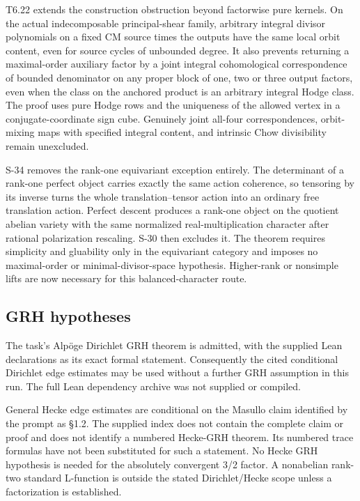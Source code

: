 \documentclass[11pt,a4paper]{article}
\theoremstyle{definition}
\begin{document}
T6.22 extends the construction obstruction beyond factorwise pure
kernels. On the actual indecomposable principal-shear family, arbitrary
integral divisor polynomials on a fixed CM source times the outputs have
the same local orbit content, even for source cycles of unbounded
degree. It also prevents returning a maximal-order auxiliary factor by a
joint integral cohomological correspondence of bounded denominator on
any proper block of one, two or three output factors, even when the
class on the anchored product is an arbitrary integral Hodge class. The
proof uses pure Hodge rows and the uniqueness of the allowed vertex in a
conjugate-coordinate sign cube. Genuinely joint all-four
correspondences, orbit-mixing maps with specified integral content, and
intrinsic Chow divisibility remain unexcluded.

S-34 removes the rank-one equivariant exception entirely. The
determinant of a rank-one perfect object carries exactly the same action
coherence, so tensoring by its inverse turns the whole
translation--tensor action into an ordinary free translation action.
Perfect descent produces a rank-one object on the quotient abelian
variety with the same normalized real-multiplication character after
rational polarization rescaling. S-30 then excludes it. The theorem
requires simplicity and gluability only in the equivariant category and
imposes no maximal-order or minimal-divisor-space hypothesis.
Higher-rank or nonsimple lifts are now necessary for this
balanced-character route.

\subsection{GRH hypotheses}\label{IMPLICATIONS-grh-hypotheses}

The task's Alpöge Dirichlet GRH theorem is admitted, with the supplied
Lean declarations as its exact formal statement. Consequently the cited
conditional Dirichlet edge estimates may be used without a further GRH
assumption in this run. The full Lean dependency archive was not
supplied or compiled.

General Hecke edge estimates are conditional on the Masullo claim
identified by the prompt as §1.2. The supplied index does not contain
the complete claim or proof and does not identify a numbered Hecke-GRH
theorem. Its numbered trace formulas have not been substituted for such
a statement. No Hecke GRH hypothesis is needed for the absolutely
convergent 3/2 factor. A nonabelian rank-two standard L-function is
outside the stated Dirichlet/Hecke scope unless a factorization is
established.
\end{document}
